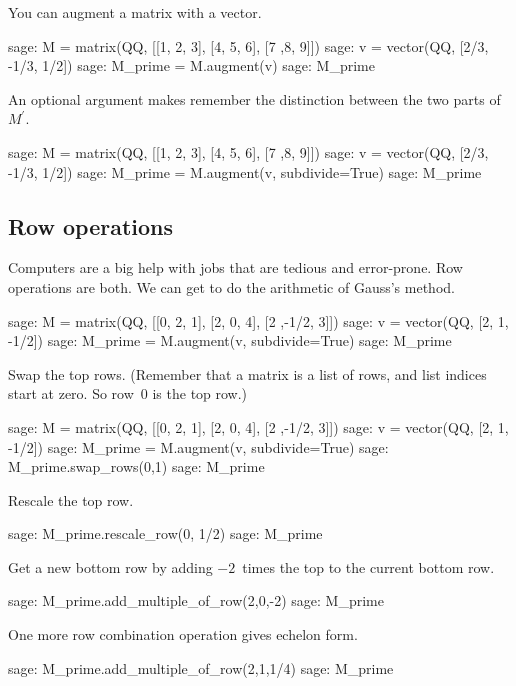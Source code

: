 You can augment a matrix with a vector.
\begin{sagecommandline}
sage: M = matrix(QQ, [[1, 2, 3], [4, 5, 6], [7 ,8, 9]])
sage: v = vector(QQ, [2/3, -1/3, 1/2])
sage: M_prime = M.augment(v)
sage: M_prime
\end{sagecommandline}
\noindent
An optional argument makes 
\Sage{} remember the distinction between the two parts 
of $M^\prime$.
\begin{sagecommandline}
sage: M = matrix(QQ, [[1, 2, 3], [4, 5, 6], [7 ,8, 9]])
sage: v = vector(QQ, [2/3, -1/3, 1/2])
sage: M_prime = M.augment(v, subdivide=True)
sage: M_prime                              
\end{sagecommandline}



\subsection{Row operations}
Computers are a big help with jobs that are tedious and error-prone.
Row operations are both.
We can get \Sage{} to do the arithmetic of Gauss's method.
\begin{sagecommandline}
sage: M = matrix(QQ, [[0, 2, 1], [2, 0, 4], [2 ,-1/2, 3]])
sage: v = vector(QQ, [2, 1, -1/2])                        
sage: M_prime = M.augment(v, subdivide=True)              
sage: M_prime                                             
\end{sagecommandline}
\noindent
Swap the top rows. 
(Remember that a matrix is a list of rows, 
and list indices start at zero.
So row~$0$ is the top row.)
\begin{sagecommandline}
sage: M = matrix(QQ, [[0, 2, 1], [2, 0, 4], [2 ,-1/2, 3]])
sage: v = vector(QQ, [2, 1, -1/2])                        
sage: M_prime = M.augment(v, subdivide=True)              
sage: M_prime.swap_rows(0,1)
sage: M_prime
\end{sagecommandline}
\noindent
Rescale the top row.
\begin{sagecommandline}
sage: M_prime.rescale_row(0, 1/2)
sage: M_prime
\end{sagecommandline}
\noindent
Get a new  bottom row by adding $-2$~times the top to the current bottom
row.
\begin{sagecommandline}
sage: M_prime.add_multiple_of_row(2,0,-2)
sage: M_prime
\end{sagecommandline}
\noindent
One more row combination operation gives echelon form.
\begin{sagecommandline}
sage: M_prime.add_multiple_of_row(2,1,1/4)
sage: M_prime                             
\end{sagecommandline}

